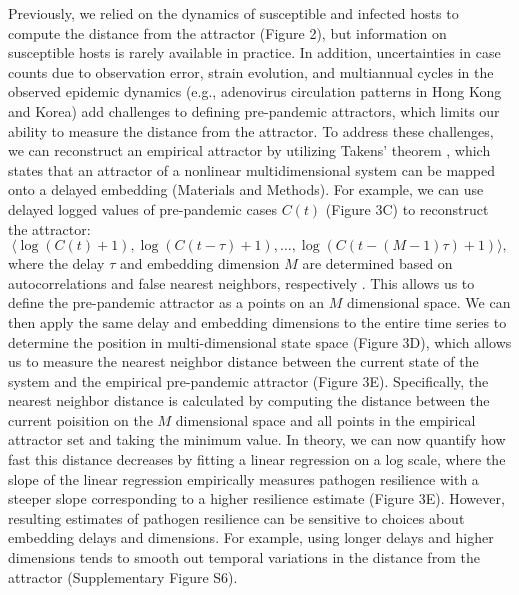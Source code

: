 \documentclass[12pt]{article}
\begin{document}
Previously, we relied on the dynamics of susceptible and infected hosts to compute the distance from the attractor (Figure 2), but information on susceptible hosts is rarely available in practice.
In addition, uncertainties in case counts due to observation error, strain evolution, and multiannual cycles in the observed epidemic dynamics (e.g., adenovirus circulation patterns in Hong Kong and Korea) add challenges to defining pre-pandemic attractors, which limits our ability to measure the distance from the attractor.
To address these challenges, we can reconstruct an empirical attractor by utilizing Takens' theorem \citep{takens2006detecting}, which states that an attractor of a nonlinear multidimensional system can be mapped onto a delayed embedding (Materials and Methods).
For example, we can use delayed logged values of pre-pandemic cases $C(t)$ (Figure 3C) to reconstruct the attractor:
\begin{equation}
\langle\log(C(t)+1), \log(C(t-\tau)+1), \dots, \log(C(t-(M-1)\tau)+1)\rangle,
\end{equation}
where the delay $\tau$ and embedding dimension $M$ are determined based on autocorrelations and false nearest neighbors, respectively \citep{kennel1992determining,tan2023selecting}.
This allows us to define the pre-pandemic attractor as a points on an $M$ dimensional space.
We can then apply the same delay and embedding dimensions to the entire time series to determine the position in multi-dimensional state space (Figure 3D), which allows us to measure the nearest neighbor distance between the current state of the system and the empirical pre-pandemic attractor (Figure 3E).
Specifically, the nearest neighbor distance is calculated by computing the distance between the current poisition on the $M$ dimensional space and all points in the empirical attractor set and taking the minimum value.
In theory, we can now quantify how fast this distance decreases by fitting a linear regression on a log scale, where the slope of the linear regression empirically measures pathogen resilience with a steeper slope corresponding to a higher resilience estimate (Figure 3E).
However, resulting estimates of pathogen resilience can be sensitive to choices about embedding delays and dimensions.
For example, using longer delays and higher dimensions tends to smooth out temporal variations in the distance from the attractor (Supplementary Figure S6).
\end{document}
